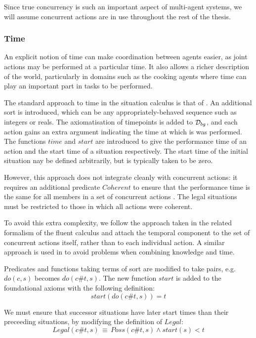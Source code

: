 Since true concurrency is such an important aspect of multi-agent
systems, we will assume concurrent actions are in use throughout the
rest of the thesis.


\subsubsection{Time}

\label{sec:Background:Time}

An explicit notion of time can make coordination between agents easier,
as joint actions may be performed at a particular time. It also allows
a richer description of the world, particularly in domains such as
the cooking agents where time can play an important part in tasks
to be performed.

The standard approach to time in the situation calculus is that of
\citep{pinto94temporal,reiter96sc_nat_conc}. An additional sort 
is introduced, which can be any appropriately-behaved sequence such
as integers or reals. The axiomatisation of timepoints is added to
$\mathcal{D}_{bg}$, and each action gains an extra argument indicating the
time at which is was performed. The functions $time$ and $start$
are introduced to give the performance time of an action and the start
time of a situation respectively. The start time of the initial situation
nay be defined arbitrarily, but is typically taken to be zero.

However, this approach does not integrate cleanly with concurrent
actions: it requires an additional predicate $Coherent$ to ensure
that the performance time is the same for all members in a set of
concurrent actions \citep{reiter96sc_nat_conc}. The legal situations
must be restricted to those in which all actions were coherent.

To avoid this extra complexity, we follow the approach taken in the
related formalism of the fluent calculus \citep{martin03conc_flux}
and attach the temporal component to the set of concurrent actions
itself, rather than to each individual action. A similar approach
is used in \citep{scherl03conc_knowledge} to avoid problems when
combining knowledge and time.

Predicates and functions taking terms of sort  are modified
to take  pairs, e.g. $do(c,s)$ becomes
$do(c\#t,s)$. The new function $start$ is added to the foundational
axioms with the following definition:\[
start(do(c\#t,s))=t\]


We must ensure that successor situations have later start times than
their preceeding situations, by modifying the definition of $Legal$:\[
Legal(c\#t,s)\,\equiv\, Poss(c\#t,s)\wedge start(s)<t\]


